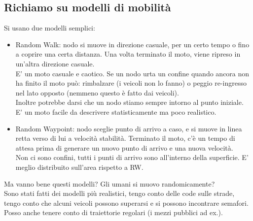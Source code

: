 \documentclass[12pt,italian]{report}
\begin{document}
\subsection{Richiamo su modelli di mobilità}
Si usano due modelli semplici:
\begin{itemize}
    \item Random Walk: nodo si muove in direzione casuale, per un certo tempo o fino a coprire una certa distanza. Una volta terminato il moto, viene ripreso in un'altra direzione casuale. \\ E' un moto casuale e caotico. Se un nodo urta un confine quando ancora non ha finito il moto può: rimbalzare (i veicoli non lo fanno) o peggio re-ingresso nel lato opposto (nemmeno questo è fatto dai veicoli). \\ Inoltre potrebbe darsi che un nodo stiamo sempre intorno al punto iniziale. \\ E' un moto facile da descrivere statisticamente ma poco realistico.
    \item Random Waypoint: nodo sceglie punto di arrivo a caso, e si muove in linea retta verso di lui a velocità stabilità. Terminato il moto, c'è un tempo di attesa prima di generare un nuovo punto di arrivo e una nuova velocità. \\ Non ci sono confini, tutti i punti di arrivo sono all'interno della superficie. E' meglio distribuito sull'area rispetto a RW. 
\end{itemize}
Ma vanno bene questi modelli? Gli umani si muovo randomicamente? \\
Sono stati fatti dei modelli più realistici, tengo conto delle code sulle strade, tengo conto che alcuni veicoli possono superarsi e si possono incontrare semafori. Posso anche tenere conto di traiettorie regolari (i mezzi pubblici ad ex.).
\end{document}

